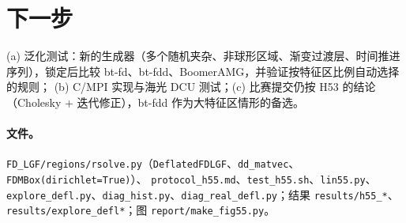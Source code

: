 \documentclass[11pt,a4paper]{ctexart}
\begin{document}
\section{下一步}
(a) 泛化测试：新的生成器（多个随机夹杂、非球形区域、渐变过渡层、时间推进序列），锁定后比较 bt-fd、bt-fdd、BoomerAMG，并验证按特征区比例自动选择的规则；
(b) C/MPI 实现与海光 DCU 测试；(c) 比赛提交仍按 H53 的结论（Cholesky + 迭代修正），bt-fdd 作为大特征区情形的备选。

\paragraph{文件。}\sloppy \texttt{FD\_LGF/regions/rsolve.py}（\texttt{DeflatedFDLGF}、\texttt{dd\_matvec}、\texttt{FDMBox(dirichlet=True)}）、
\texttt{protocol\_h55.md}、\texttt{test\_h55.sh}、\texttt{lin55.py}、\texttt{explore\_defl.py}、\texttt{diag\_hist.py}、\texttt{diag\_real\_defl.py}；结果 \texttt{results/h55\_*}、\texttt{results/explore\_defl*}；图 \texttt{report/make\_fig55.py}。
\end{document}
